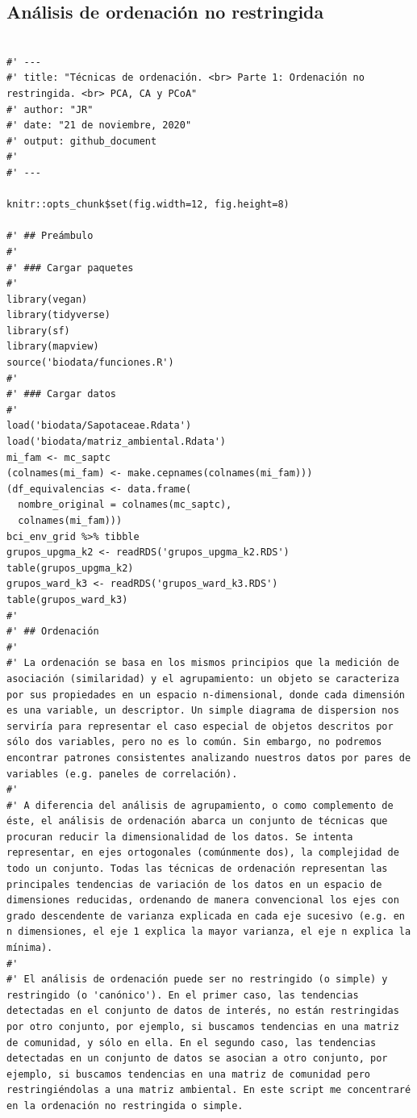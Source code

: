 \documentclass[11pt,]{article}
\begin{document}
\subsection{Análisis de ordenación no
restringida}\label{anuxe1lisis-de-ordenaciuxf3n-no-restringida}

\begin{verbatim}

#' ---
#' title: "Técnicas de ordenación. <br> Parte 1: Ordenación no restringida. <br> PCA, CA y PCoA"
#' author: "JR"
#' date: "21 de noviembre, 2020"
#' output: github_document
#' 
#' ---

knitr::opts_chunk$set(fig.width=12, fig.height=8)

#' ## Preámbulo
#' 
#' ### Cargar paquetes
#' 
library(vegan)
library(tidyverse)
library(sf)
library(mapview)
source('biodata/funciones.R')
#' 
#' ### Cargar datos
#' 
load('biodata/Sapotaceae.Rdata')
load('biodata/matriz_ambiental.Rdata')
mi_fam <- mc_saptc
(colnames(mi_fam) <- make.cepnames(colnames(mi_fam)))
(df_equivalencias <- data.frame(
  nombre_original = colnames(mc_saptc),
  colnames(mi_fam)))
bci_env_grid %>% tibble
grupos_upgma_k2 <- readRDS('grupos_upgma_k2.RDS')
table(grupos_upgma_k2)
grupos_ward_k3 <- readRDS('grupos_ward_k3.RDS')
table(grupos_ward_k3)
#' 
#' ## Ordenación
#' 
#' La ordenación se basa en los mismos principios que la medición de asociación (similaridad) y el agrupamiento: un objeto se caracteriza por sus propiedades en un espacio n-dimensional, donde cada dimensión es una variable, un descriptor. Un simple diagrama de dispersion nos serviría para representar el caso especial de objetos descritos por sólo dos variables, pero no es lo común. Sin embargo, no podremos encontrar patrones consistentes analizando nuestros datos por pares de variables (e.g. paneles de correlación).
#' 
#' A diferencia del análisis de agrupamiento, o como complemento de éste, el análisis de ordenación abarca un conjunto de técnicas que procuran reducir la dimensionalidad de los datos. Se intenta representar, en ejes ortogonales (comúnmente dos), la complejidad de todo un conjunto. Todas las técnicas de ordenación representan las principales tendencias de variación de los datos en un espacio de dimensiones reducidas, ordenando de manera convencional los ejes con grado descendente de varianza explicada en cada eje sucesivo (e.g. en n dimensiones, el eje 1 explica la mayor varianza, el eje n explica la mínima).
#' 
#' El análisis de ordenación puede ser no restringido (o simple) y restringido (o 'canónico'). En el primer caso, las tendencias detectadas en el conjunto de datos de interés, no están restringidas por otro conjunto, por ejemplo, si buscamos tendencias en una matriz de comunidad, y sólo en ella. En el segundo caso, las tendencias detectadas en un conjunto de datos se asocian a otro conjunto, por ejemplo, si buscamos tendencias en una matriz de comunidad pero restringiéndolas a una matriz ambiental. En este script me concentraré en la ordenación no restringida o simple.

\end{verbatim}
\end{document}
